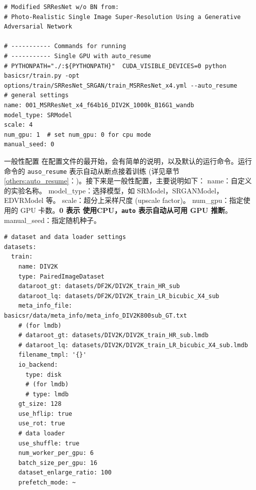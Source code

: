 \documentclass[../main.tex]{subfiles}
\begin{document}
\begin{verbatim}
# Modified SRResNet w/o BN from:
# Photo-Realistic Single Image Super-Resolution Using a Generative Adversarial Network

# ----------- Commands for running
# ----------- Single GPU with auto_resume
# PYTHONPATH="./:${PYTHONPATH}"  CUDA_VISIBLE_DEVICES=0 python basicsr/train.py -opt options/train/SRResNet_SRGAN/train_MSRResNet_x4.yml --auto_resume
# general settings
name: 001_MSRResNet_x4_f64b16_DIV2K_1000k_B16G1_wandb
model_type: SRModel
scale: 4
num_gpu: 1  # set num_gpu: 0 for cpu mode
manual_seed: 0
\end{verbatim}
\begin{exampleBox}[righthand ratio=0.00, sidebyside, sidebyside align=center, lower separated=false]{一般性配置}
在配置文件的最开始，会有简单的说明，以及默认的运行命令。运行命令的 \texttt{auso\_resume} 表示自动从断点接着训练 (详见章节\ref{others:auto_resume}：)。接下来是一般性配置，主要说明如下：
name：自定义的实验名称。
model\_type：选择模型，如 SRModel，SRGANModel，EDVRModel 等。
scale：超分上采样尺度 (upscale factor)。
num\_gpu：指定使用的 GPU 卡数。\textbf{0 表示 使用CPU，\texttt{auto} 表示自动从可用 GPU 推断}。
manual\_seed：指定随机种子。
\end{exampleBox}
\begin{verbatim}
# dataset and data loader settings
datasets:
  train:
    name: DIV2K
    type: PairedImageDataset
    dataroot_gt: datasets/DF2K/DIV2K_train_HR_sub
    dataroot_lq: datasets/DF2K/DIV2K_train_LR_bicubic_X4_sub
    meta_info_file: basicsr/data/meta_info/meta_info_DIV2K800sub_GT.txt
    # (for lmdb)
    # dataroot_gt: datasets/DIV2K/DIV2K_train_HR_sub.lmdb
    # dataroot_lq: datasets/DIV2K/DIV2K_train_LR_bicubic_X4_sub.lmdb
    filename_tmpl: '{}'
    io_backend:
      type: disk
      # (for lmdb)
      # type: lmdb
    gt_size: 128
    use_hflip: true
    use_rot: true
    # data loader
    use_shuffle: true
    num_worker_per_gpu: 6
    batch_size_per_gpu: 16
    dataset_enlarge_ratio: 100
    prefetch_mode: ~
\end{verbatim}
\end{document}
